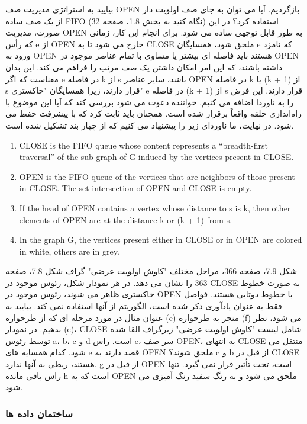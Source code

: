 \documentclass{book} %
\begin{document}
بیایید به استراتژی مدیریت صف OPEN بازگردیم. آیا می توان به جای صف اولویت دار از یک صف ساده FIFO (نگاه کنید به بخش 1.8، صفحه 32) استفاده کرد؟ در این صورت، مدیریت OPEN به طور قابل توجهی ساده می شود. برای انجام این کار، زمانی که رأس e از OPEN خارج می شود تا به CLOSE ملحق شود، همسایگان e که نامزد ورود به OPEN هستند باید فاصله ای بیشتر یا مساوی با تمام عناصر موجود در OPEN داشته باشند، که این امر امکان داشتن یک صف مرتب را فراهم می کند. این بدان معناست که اگر e در فاصله k از s باشد، سایر عناصر OPEN در فاصله k یا (k + 1) از s قرار دارند، زیرا همسایگان "خاکستری" e در فاصله (k + 1) از s قرار دارند. این فرض را به ناوردا اضافه می کنیم. خواننده دعوت می شود بررسی کند که آیا این موضوع با راه‌اندازی حلقه واقعاً برقرار شده است. همچنان باید ثابت کرد که با پیشرفت حفظ می شود. در نهایت، ما ناوردای زیر را پیشنهاد می کنیم که از چهار بند تشکیل شده است.

\begin{enumerate}
    \item CLOSE is the FIFO queue whose content represents a “breadth-first traversal” of the
    sub-graph of G induced by the vertices present in CLOSE.
    \item OPEN is the FIFO queue of the vertices that are neighbors of those present in CLOSE.
    The set intersection of OPEN and CLOSE is empty.
    \item If the head of OPEN contains a vertex whose distance to s is k, then other elements of
    OPEN are at the distance k or (k + 1) from s.
    \item In the graph G, the vertices present either in CLOSE or in OPEN are colored in white,
    others are in grey.
\end{enumerate}
\newpage

شکل 7.9، صفحه 366، مراحل مختلف "کاوش اولویت عرضی" گراف شکل 7.8، صفحه 363 را نشان می دهد. در هر نمودار شکل، رئوس موجود در CLOSE به صورت خطوط خاکستری ظاهر می شوند، رئوس موجود در OPEN با خطوط دوتایی هستند. فواصل فقط به عنوان یادآوری ذکر شده است، الگوریتم از آنها استفاده نمی کند. بیایید به عنوان مثال در مورد مرحله ای که از طرحواره (e) منجر به طرحواره (f) می شود، نظر بدهیم. در نمودار (e)، CLOSE شامل لیست "کاوش اولویت عرضی" زیرگراف القا شده توسط رئوس a، b، c و d است. راس e، سر صف OPEN، به انتهای CLOSE منتقل می شود. کدام همسایه های e قصد دارند به OPEN ملحق شوند؟ c و b از قبل در CLOSE هستند، ربطی به آنها ندارد. g از قبل در OPEN است، تحت تأثیر قرار نمی گیرد. تنها راس باقی مانده h است که به OPEN ملحق می شود و به رنگ سفید رنگ آمیزی می شود.

\subsubsection*{ساختمان داده ها}
\end{document}
